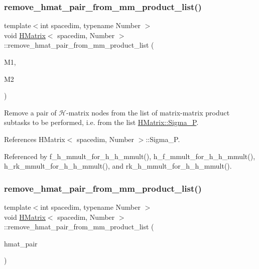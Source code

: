 \subsubsection{\texorpdfstring{remove\+\_\+hmat\+\_\+pair\+\_\+from\+\_\+mm\+\_\+product\+\_\+list()}{remove\_hmat\_pair\_from\_mm\_product\_list()}\hspace{0.1cm}{\footnotesize\ttfamily [1/2]}}
{\footnotesize\ttfamily template$<$int spacedim, typename Number $>$ \\
void \hyperlink{classHMatrix}{H\+Matrix}$<$ spacedim, Number $>$\+::remove\+\_\+hmat\+\_\+pair\+\_\+from\+\_\+mm\+\_\+product\+\_\+list (\begin{DoxyParamCaption}\item[{const \hyperlink{classHMatrix}{H\+Matrix}$<$ spacedim, Number $>$ $\ast$}]{M1,  }\item[{const \hyperlink{classHMatrix}{H\+Matrix}$<$ spacedim, Number $>$ $\ast$}]{M2 }\end{DoxyParamCaption})}

Remove a pair of $\mathcal{H}$-\/matrix nodes from the list of matrix-\/matrix product subtasks to be performed, i.\+e. from the list {\ttfamily \hyperlink{classHMatrix_a3d96d0252ef8c873ae06cf87874acaf3}{H\+Matrix\+::\+Sigma\+\_\+P}}. 

References H\+Matrix$<$ spacedim, Number $>$\+::\+Sigma\+\_\+P.



Referenced by f\+\_\+h\+\_\+mmult\+\_\+for\+\_\+h\+\_\+h\+\_\+mmult(), h\+\_\+f\+\_\+mmult\+\_\+for\+\_\+h\+\_\+h\+\_\+mmult(), h\+\_\+rk\+\_\+mmult\+\_\+for\+\_\+h\+\_\+h\+\_\+mmult(), and rk\+\_\+h\+\_\+mmult\+\_\+for\+\_\+h\+\_\+h\+\_\+mmult().

\mbox{\label{classHMatrix_ae0ab9b3be4ea0ef959da40e81313b2e3}} 
\subsubsection{\texorpdfstring{remove\+\_\+hmat\+\_\+pair\+\_\+from\+\_\+mm\+\_\+product\+\_\+list()}{remove\_hmat\_pair\_from\_mm\_product\_list()}\hspace{0.1cm}{\footnotesize\ttfamily [2/2]}}
{\footnotesize\ttfamily template$<$int spacedim, typename Number $>$ \\
void \hyperlink{classHMatrix}{H\+Matrix}$<$ spacedim, Number $>$\+::remove\+\_\+hmat\+\_\+pair\+\_\+from\+\_\+mm\+\_\+product\+\_\+list (\begin{DoxyParamCaption}\item[{const std\+::pair$<$ const \hyperlink{classHMatrix}{H\+Matrix}$<$ spacedim, Number $>$ $\ast$, const \hyperlink{classHMatrix}{H\+Matrix}$<$ spacedim, Number $>$ $\ast$$>$ \&}]{hmat\+\_\+pair }\end{DoxyParamCaption})}

